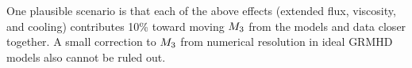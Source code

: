 One plausible scenario is that each of the above effects (extended flux, viscosity, and cooling) contributes 10\% toward moving $M_{3}$ from the models and data closer together. A small correction to $M_{3}$ from numerical resolution in ideal GRMHD models also cannot be ruled out.





